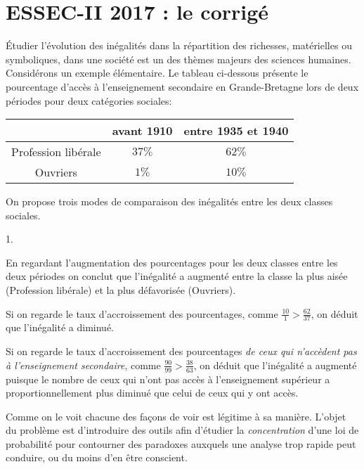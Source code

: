 \chapter*{ESSEC-II 2017 : le corrigé}
  
%

\noindent
Étudier l'évolution des inégalités dans la répartition des richesses, 
matérielles ou symboliques, dans une société est un des thèmes majeurs 
des sciences humaines. Considérons un exemple élémentaire. Le tableau 
ci-dessous présente le pourcentage d'accès à l'enseignement secondaire 
en Grande-Bretagne lors de deux périodes pour deux catégories sociales: 
\\
\begin{center} 
 \begin{tabular}{c|c|c|} 
  & avant 1910 & entre 1935 et 1940\\ \hline
  Profession libérale & $37\%$ & $62\%$ \\ \hline
  Ouvriers & $1\%$ & $10\%$ \\ \hline
 \end{tabular}
\end{center}
On propose trois modes de comparaison des inégalités entre les deux 
classes sociales.
\begin{noliste}{1.}
 \item En regardant l'augmentation des pourcentages pour les deux 
 classes entre les deux périodes on conclut que l'inégalité a augmenté 
 entre la classe la plus aisée (Profession libérale) et la plus 
 défavorisée (Ouvriers). 
 
 \item Si on regarde le taux d'accroissement des pourcentages, comme 
 $\frac{10}{1} > \frac{62}{37}$, on déduit que l'inégalité a diminué.
 
 \item Si on regarde le taux d'accroissement des pourcentages \emph{de 
 ceux qui n'accèdent pas à l'enseignement secondaire}, comme 
 $\frac{90}{99} > \frac{38}{63}$, on déduit que l'inégalité a 
 augmenté puisque le nombre de ceux qui n'ont pas accès à 
 l'enseignement supérieur a proportionnellement plus diminué que celui 
 de ceux qui y ont accès.
\end{noliste}
Comme on le voit chacune des façons de voir est légitime à sa manière. 
L'objet du problème est d'introduire des outils afin d'étudier la 
\emph{concentration} d'une loi de probabilité pour contourner des 
paradoxes auxquels une analyse trop rapide peut conduire, ou du moins 
d'en être conscient.




